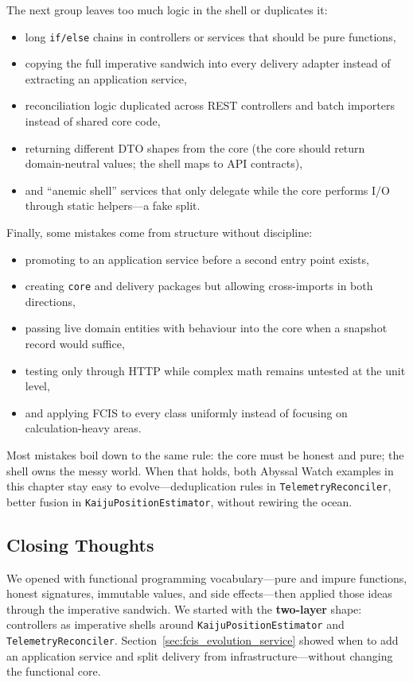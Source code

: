 The next group leaves too much logic in the shell or duplicates it:
\begin{itemize}
    \item long \texttt{if/else} chains in controllers or services that should be pure functions,
    \item copying the full imperative sandwich into every delivery adapter instead of extracting an application service,
    \item reconciliation logic duplicated across REST controllers and batch importers instead of shared core code,
    \item returning different DTO shapes from the core (the core should return domain-neutral values; the shell maps to API contracts),
    \item and ``anemic shell'' services that only delegate while the core performs I/O through static helpers---a fake split.
\end{itemize}

Finally, some mistakes come from structure without discipline:
\begin{itemize}
    \item promoting to an application service before a second entry point exists,
    \item creating \texttt{core} and delivery packages but allowing cross-imports in both directions,
    \item passing live domain entities with behaviour into the core when a snapshot record would suffice,
    \item testing only through HTTP while complex math remains untested at the unit level,
    \item and applying FCIS to every class uniformly instead of focusing on calculation-heavy areas.
\end{itemize}

Most mistakes boil down to the same rule: the core must be honest and pure; the shell owns the messy world. When that holds, both Abyssal Watch examples in this chapter stay easy to evolve---deduplication rules in \texttt{TelemetryReconciler}, better fusion in \texttt{KaijuPositionEstimator}, without rewiring the ocean.

\subsection{Closing Thoughts}
\label{sec:fcis_closing}

We opened with functional programming vocabulary---pure and impure functions, honest signatures, immutable values, and side effects---then applied those ideas through the imperative sandwich. We started with the \textbf{two-layer} shape: controllers as imperative shells around \texttt{KaijuPositionEstimator} and \texttt{TelemetryReconciler}. Section~\ref{sec:fcis_evolution_service} showed when to add an application service and split delivery from infrastructure---without changing the functional core.

